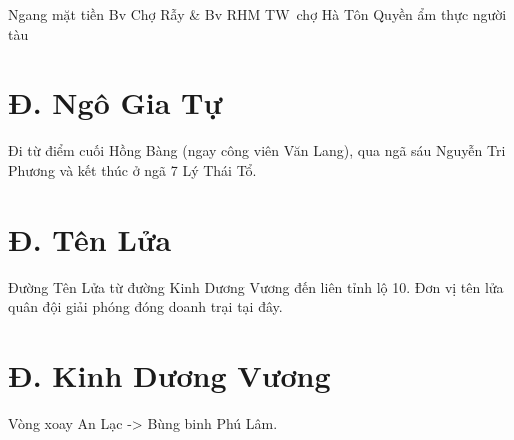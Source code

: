 Ngang mặt tiền Bv Chợ Rẫy & Bv RHM TW\
chợ Hà Tôn Quyền ẩm thực người tàu

\section{Đ. Ngô Gia Tự}

Đi từ điểm cuối Hồng Bàng (ngay công viên Văn Lang), qua ngã sáu Nguyễn Tri Phương và kết thúc ở ngã 7 Lý Thái Tổ.

\section{Đ. Tên Lửa}

Đường Tên Lửa từ đường Kinh Dương Vương đến liên tỉnh lộ 10. Đơn vị tên lửa quân đội giải phóng đóng doanh trại tại đây.

\section{Đ. Kinh Dương Vương}

Vòng xoay An Lạc -> Bùng binh Phú Lâm.

